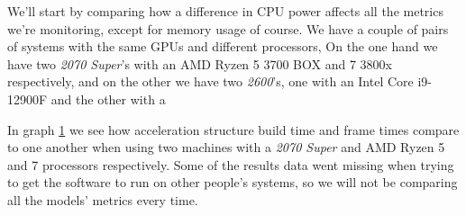 We'll start by comparing how a difference in CPU power affects all the metrics we're monitoring, except for memory usage of course. We have a couple of pairs of systems with the same GPUs and different processors, On the one hand we have two \textit{2070 Super}'s with an AMD Ryzen 5 3700 BOX and 7 3800x respectively, and on the other we have two \textit{2600}'s, one with an Intel Core i9-12900F and the other with a %

In graph \ref{2070-super-comparison} we see how acceleration structure build time and frame times compare to one another when using two machines with a \textit{2070 Super} and AMD Ryzen 5 and 7 processors respectively. Some of the results data went missing when trying to get the software to run on other people's systems, so we will not be comparing all the models' metrics every time.

\begin{figure}
    \\
    \caption{}
    \label{2070-super-comparison}
\end{figure}
